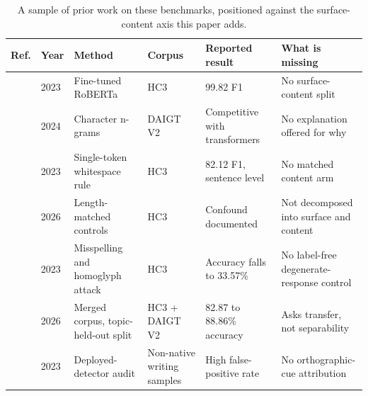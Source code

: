 \begin{table}[!t]
\centering
\caption{A sample of prior work on these benchmarks, positioned against the surface-content axis this paper adds.}
\label{tab:relatedwork}
\footnotesize
\begin{tabularx}{\textwidth}{@{}clXXXX@{}}
\toprule
Ref. & Year & Method & Corpus & Reported result & What is missing \\
\midrule
\cite{Guo2023close} & 2023 & Fine-tuned RoBERTa & HC3 & 99.82 F1 & No surface-content split \\
\cite{Zhou2024exploiting} & 2024 & Character n-grams & DAIGT V2 & Competitive with transformers & No explanation offered for why \\
\cite{Tian2023multiscale} & 2023 & Single-token whitespace rule & HC3 & 82.12 F1, sentence level & No matched content arm \\
\cite{Baidya2026detecting} & 2026 & Length-matched controls & HC3 & Confound documented & Not decomposed into surface and content \\
\cite{Antoun2023towards} & 2023 & Misspelling and homoglyph attack & HC3 & Accuracy falls to 33.57\% & No label-free degenerate-response control \\
\cite{Alikhanov2026generated} & 2026 & Merged corpus, topic-held-out split & HC3 + DAIGT V2 & 82.87 to 88.86\% accuracy & Asks transfer, not separability \\
\cite{Liang2023gpt} & 2023 & Deployed-detector audit & Non-native writing samples & High false-positive rate & No orthographic-cue attribution \\
\bottomrule
\end{tabularx}
\end{table}
